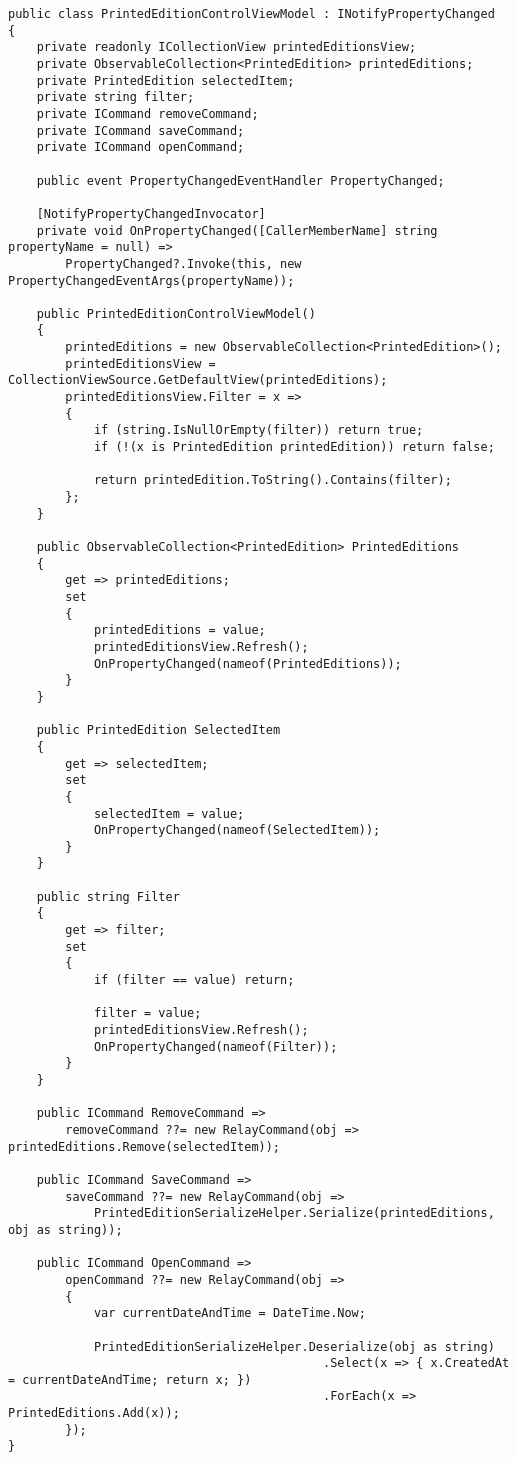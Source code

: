 \documentclass[a4paper,14pt]{extarticle}
\begin{document}
\begin{lstlisting}
public class PrintedEditionControlViewModel : INotifyPropertyChanged
{
    private readonly ICollectionView printedEditionsView;
    private ObservableCollection<PrintedEdition> printedEditions;
    private PrintedEdition selectedItem;
    private string filter;
    private ICommand removeCommand;
    private ICommand saveCommand;
    private ICommand openCommand;

    public event PropertyChangedEventHandler PropertyChanged;

    [NotifyPropertyChangedInvocator]
    private void OnPropertyChanged([CallerMemberName] string propertyName = null) =>
        PropertyChanged?.Invoke(this, new PropertyChangedEventArgs(propertyName));

    public PrintedEditionControlViewModel()
    {
        printedEditions = new ObservableCollection<PrintedEdition>();
        printedEditionsView = CollectionViewSource.GetDefaultView(printedEditions);
        printedEditionsView.Filter = x =>
        {
            if (string.IsNullOrEmpty(filter)) return true;
            if (!(x is PrintedEdition printedEdition)) return false;

            return printedEdition.ToString().Contains(filter);
        };
    }

    public ObservableCollection<PrintedEdition> PrintedEditions
    {
        get => printedEditions;
        set
        {
            printedEditions = value;
            printedEditionsView.Refresh();
            OnPropertyChanged(nameof(PrintedEditions));
        }
    }

    public PrintedEdition SelectedItem
    {
        get => selectedItem;
        set
        {
            selectedItem = value;
            OnPropertyChanged(nameof(SelectedItem));
        }
    }

    public string Filter
    {
        get => filter;
        set
        {
            if (filter == value) return;

            filter = value;
            printedEditionsView.Refresh();
            OnPropertyChanged(nameof(Filter));
        }
    }

    public ICommand RemoveCommand =>
        removeCommand ??= new RelayCommand(obj => printedEditions.Remove(selectedItem));

    public ICommand SaveCommand =>
        saveCommand ??= new RelayCommand(obj =>
            PrintedEditionSerializeHelper.Serialize(printedEditions, obj as string));

    public ICommand OpenCommand =>
        openCommand ??= new RelayCommand(obj =>
        {
            var currentDateAndTime = DateTime.Now;

            PrintedEditionSerializeHelper.Deserialize(obj as string)
                                            .Select(x => { x.CreatedAt = currentDateAndTime; return x; })
                                            .ForEach(x => PrintedEditions.Add(x));
        });
}
\end{lstlisting}
\end{document}
